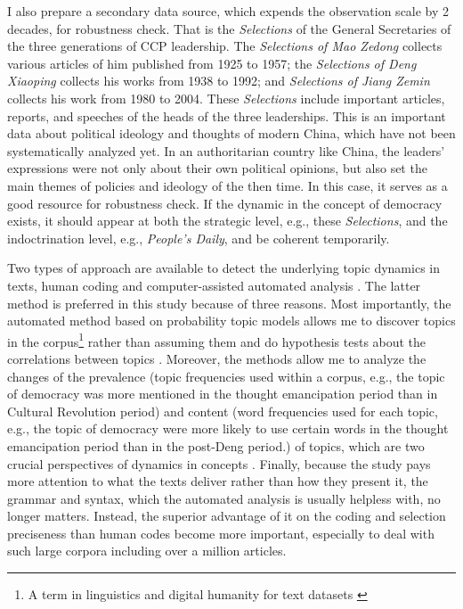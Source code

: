 \documentclass[abstracton,UTF8]{ctexart}
\begin{document}
I also prepare a secondary data source, which expends the observation scale by 2 decades, for robustness check. That is the \textit{Selections} of the General Secretaries of the three generations of CCP leadership. The \textit{Selections of Mao Zedong} collects various articles of him published from 1925 to 1957; the \textit{Selections of Deng Xiaoping} collects his works from 1938 to 1992; and \textit{Selections of Jiang Zemin} collects his work from 1980 to 2004. These \textit{Selections} include important articles, reports, and speeches of the heads of the three leaderships. This is an important data about political ideology and thoughts of modern China, which have not been systematically analyzed yet. In an authoritarian country like China, the leaders' expressions were not only about their own political opinions, but also set the main themes of policies and ideology of the then time. In this case, it serves as a good resource for robustness check. If the dynamic in the concept of democracy exists, it should appear at both the strategic level, e.g., these \textit{Selections}, and the indoctrination level, e.g., \textit{People's Daily}, and be coherent temporarily.


Two types of approach are available to detect the underlying topic dynamics in texts, human coding and computer-assisted automated analysis \citep{Lucas2015,Blei2012,Roberts2014}. The latter method is preferred in this study because of three reasons. Most importantly, the automated method based on probability topic models allows me to discover topics in the corpus\footnote{A term in linguistics and digital humanity for text datasets \citep{Jockers2013}} rather than assuming them and do hypothesis tests about the correlations between topics \citep{Roberts2013}. Moreover, the methods allow me to analyze the changes of the prevalence (topic frequencies used within a corpus, e.g., the topic of democracy was more mentioned in the thought emancipation period than in Cultural Revolution period) and content (word frequencies used for each topic, e.g., the topic of democracy were more likely to use certain words in the thought emancipation period than in the post-Deng period.) of topics, which are two crucial perspectives of dynamics in concepts \citep{Lucas2015}. Finally, because the study pays more attention to what the texts deliver rather than how they present it, the grammar and syntax, which the automated analysis is usually helpless with, no longer matters. Instead, the superior advantage of it on the coding and selection preciseness than human codes become more important, especially to deal with such large corpora including over a million articles.
\end{document}
